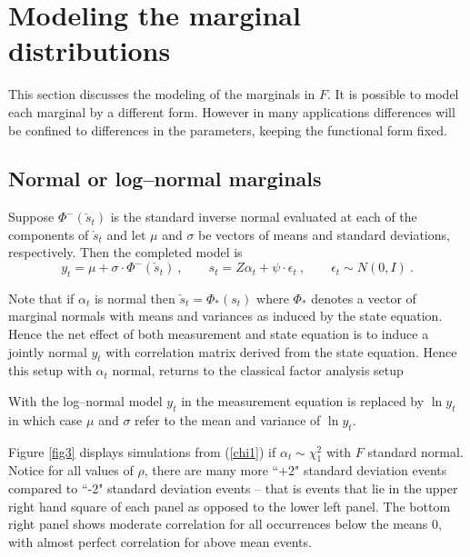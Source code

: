 \documentclass[a4paper,12pt]{article}
\newcommand{\eps}{\epsilon}
\newcommand{\eref}[1]{(\ref{#1})}
\newcommand{\fref}[1]{Figure \ref{#1}}
\begin{document}
\section{Modeling the marginal distributions}
This section discusses the modeling of the marginals in $F$.  It is possible to model each marginal by a different form.  However in many applications differences will be confined to differences in the parameters, keeping the functional form fixed.


\subsection{Normal or log--normal marginals}

Suppose $\Phi^-(\check s_t)$ is the standard inverse normal evaluated at each of the components of $\check s_t$ and let $\mu$ and $\sigma$ be vectors of means and standard deviations, respectively.  Then the completed model is
$$
y_t=\mu+\sigma\cdot\Phi^-(\check s_t)\ ,\qquad s_t=Z\alpha_t+\psi\cdot\eps_t\ , \qquad \eps_t\sim N(0,I)\ .
$$

Note that if $\alpha_t$ is normal then 
$
\check s_t=\Phi_*(s_t)
$ where $\Phi_*$ denotes a vector of marginal normals with means and variances as induced by the state equation.   Hence the net effect of both measurement and state equation is to induce a jointly normal $y_t$ with correlation matrix derived from the state equation.  Hence this setup with $\alpha_t$ normal, returns to the classical factor analysis setup \cite{dnlawley1971fas}

With the log--normal model $y_t$ in the measurement equation is replaced by $\ln y_t$ in which case $\mu$ and $\sigma$ refer to the mean and variance of $\ln y_t$.

\fref{fig3} displays simulations from \eref{chi1} if $\alpha_t\sim \chi^2_1$ with $F$ standard normal.  Notice for all values of $\rho$, there are many more ``+2" standard deviation events compared to ``-2" standard deviation events -- that is events that lie in the upper right hand square of each panel as opposed to the lower left panel.  The bottom right panel shows moderate correlation for all occurrences below the means 0, with almost perfect correlation for  above mean events.
\end{document}
